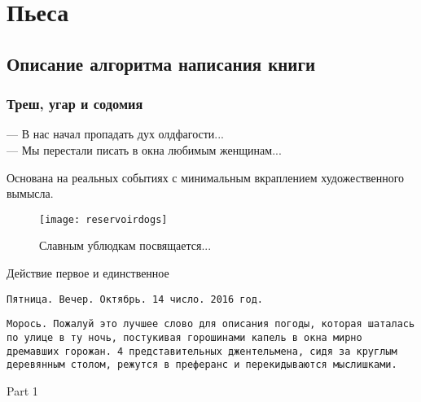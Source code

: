 \section*{Пьеса}
\subsection*{Описание алгоритма написания книги}
\subsubsection*{Треш, угар и содомия} %
\begin{epigraph}
    --- В нас начал пропадать дух олдфагости...\\
    --- Мы перестали писать в окна любимым женщинам...
\end{epigraph}

Основана на реальных событиях с минимальным вкраплением художественного вымысла.\\ 

\begin{figure}[ht!]
    \centering
    \texttt{[image: reservoirdogs]}
    \caption{Славным ублюдкам посвящается...}
\end{figure}

\begin{center}
    \Large Действие первое и единственное %
\end{center}

{\small\texttt{Пятница. Вечер. Октябрь. 14 число. 2016 год.}}

{\small\texttt{Морось. Пожалуй это лучшее слово для описания погоды, которая шаталась по улице в ту ночь, постукивая горошинами капель в окна мирно дремавших горожан. 4 представительных джентельмена, сидя за круглым деревянным столом, режутся в преферанс и перекидываются мыслишками.}}

\begin{center}
    \large Part 1
\end{center}

